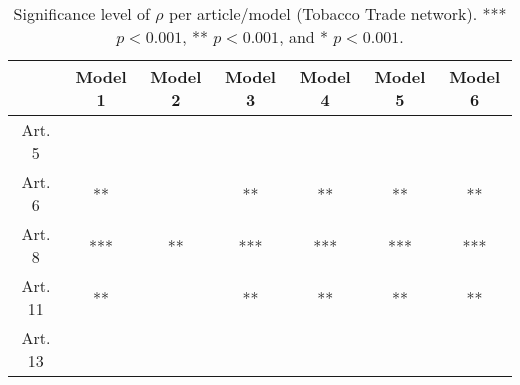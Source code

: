 \begin{table}[ht]
\centering
\begin{tabular}{ccccccc}
  \toprule
 & Model 1 & Model 2 & Model 3 & Model 4 & Model 5 & Model 6 \\ 
  \midrule
Art. 5 &   &   &   &   &   &   \\ 
   \midrule
Art. 6 & ** &   & ** & ** & ** & ** \\ 
   \midrule
Art. 8 & *** & ** & *** & *** & *** & *** \\ 
   \midrule
Art. 11 & ** &   & ** & ** & ** & ** \\ 
   \midrule
Art. 13 &   &   &   &   &   &   \\ 
   \bottomrule
\end{tabular}
\caption{Significance level of $\rho$ per article/model (Tobacco Trade network). *** $p < 0.001$, ** $p < 0.001$, and * $p < 0.001$.} 
\end{table}
